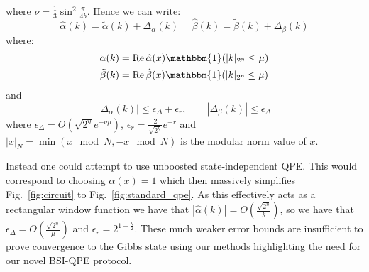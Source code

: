 \documentclass[aps,floatfix,10pt,amssymb,amsfont,amsmath,superscriptaddress,float,nofootinbib,longbibliography,nobalancelastpage,twocolumn]{revtex4-2}
\begin{document}
where $\nu = \frac{1}{3}\sin^2\frac{\pi}{4b}$. Hence we can write:
\begin{equation}
    \hat\alpha(k) = \tilde\alpha(k) + \Delta_{\alpha}(k) \>\>\>\>\>\>\hat\beta(k) = \tilde\beta(k) + \Delta_{\beta}(k)
    \label{eq:decomposealpha}
\end{equation}
where:
\begin{align}
    \tilde\alpha(k) &=\operatorname{Re} \hat\alpha(x)\mathbbm{1}(|k|_{2^{\eta}}\leq \mu)\\
    \tilde\beta(k) &= \operatorname{Re}\hat\beta(x)\mathbbm{1}(|k|_{2^{\eta}}\leq \mu)
    \label{eq:decomposealpha2}
\end{align}  and
\begin{equation}
    |\Delta_\alpha(k)|\leq \epsilon_{\Delta}+\epsilon_r,
    \qquad |\Delta_\beta(k)|\leq \epsilon_{\Delta}
    \label{eq:decomposealpha3}
\end{equation} where $\epsilon_{\Delta} = O(\sqrt{2^{\eta}}e^{-\nu \mu})$, $\epsilon_r = \frac{2}{\sqrt{2^{\eta}}}e^{-r}$ and $|x|_N = \min(x \mod N,- x\mod N)$ is the modular norm value of $x$.


Instead one could attempt to use unboosted state-independent QPE. This would correspond to choosing $\alpha(x)=1$ which then massively simplifies Fig.~\ref{fig:circuit} to Fig.~\ref{fig:standard_qpe}. As this effectively acts as a rectangular window function we have that $|\hat\alpha(k)| = O(\frac{\sqrt{2^{\eta}}}{k})$, so we have that $\epsilon_{\Delta} = O(\frac{\sqrt{2^{\eta}}}{\mu})$ and $\epsilon_r = 2^{1-\frac{\eta}{2}}$. These much weaker error bounds are insufficient to prove convergence to the Gibbs state using our methods highlighting the need for our novel BSI-QPE protocol.
\end{document}
